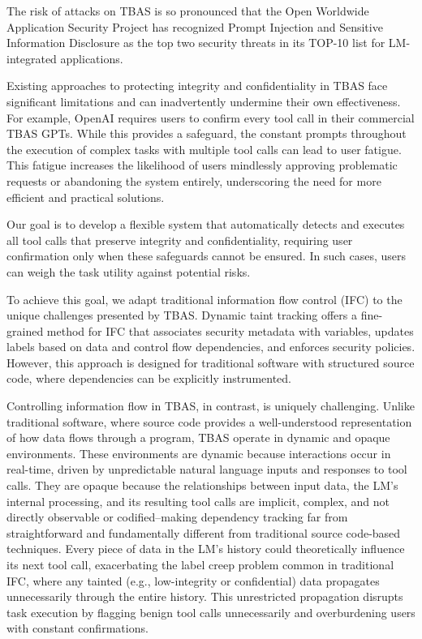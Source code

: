 The risk of attacks on TBAS is so pronounced that the Open Worldwide Application Security Project has recognized Prompt Injection and Sensitive Information Disclosure as the top two security threats in its TOP-10 list for LM-integrated applications\cite{owasp2025}.


Existing approaches to protecting integrity and confidentiality in TBAS face significant limitations and can inadvertently undermine their own effectiveness. For example, OpenAI requires users to confirm every tool call in their commercial TBAS GPTs. While this provides a safeguard, the constant prompts throughout the execution of complex tasks with multiple tool calls can lead to user fatigue. This fatigue increases the likelihood of users mindlessly approving problematic requests or abandoning the system entirely, underscoring the need for more efficient and practical solutions.


Our goal is to develop a flexible system that automatically detects and executes all tool calls that preserve integrity and confidentiality, requiring user confirmation only when these safeguards cannot be ensured. In such cases, users can weigh the task utility against potential risks. %






         

To achieve this goal, we adapt traditional information flow control (IFC)\cite{IFCDenning76} to the unique challenges presented by TBAS. 
Dynamic taint tracking\cite{Newsome2005DynamicTA} offers a fine-grained method for IFC that associates security metadata with variables, updates labels based on data and control flow dependencies, and enforces security policies. However, this approach is designed for traditional software with structured source code, where dependencies can be explicitly instrumented. 

Controlling information flow in TBAS, in contrast, is uniquely challenging. Unlike traditional software, where source code provides a well-understood representation of how data flows through a program, TBAS operate in dynamic and opaque environments. These environments are dynamic because interactions occur in real-time, driven by unpredictable natural language inputs and responses to tool calls. They are opaque because the relationships between input data, the LM's internal processing, and its resulting tool calls are implicit, complex, and not directly observable or codified--making dependency tracking far from straightforward and fundamentally different from traditional source code-based techniques. Every piece of data in the LM's history could theoretically influence its next tool call, exacerbating the label creep problem common in traditional IFC\cite{languagebasedinfoflow}, where any tainted (e.g., low-integrity or confidential) data propagates unnecessarily through the entire history. This unrestricted propagation disrupts task execution by flagging benign tool calls unnecessarily and overburdening users with constant confirmations.











